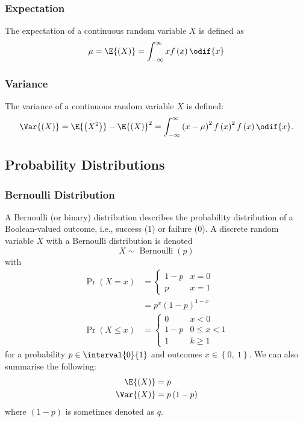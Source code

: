 \documentclass{article}
\begin{document}
\subsubsection{Expectation}
The expectation of a continuous random variable \(X\) is defined as
\begin{equation*}
    \mu = \E{\left( X \right)} = \int_{-\infty}^\infty x f\left( x \right) \odif{x}
\end{equation*}
\subsubsection{Variance}
The variance of a continuous random variable \(X\) is defined:
\begin{equation*}
    \Var{\left( X \right)} = \E{\left( X^2 \right)} - \E{\left( X \right)}^2 = \int_{-\infty}^\infty \left( x - \mu \right)^2 f\left( x \right)^2 f\left( x \right) \odif{x}.
\end{equation*}
\subsection{Probability Distributions}
\subsubsection{Bernoulli Distribution}
A Bernoulli (or binary) distribution describes the probability
distribution of a Boolean-valued outcome, i.e., success (1) or failure
(0). A discrete random variable \(X\) with a Bernoulli distribution is
denoted
\begin{equation*}
    X \sim \operatorname{Bernoulli}{\left( p \right)}
\end{equation*}
with
\begin{align*}
    \Pr{\left( X = x \right)}    & =
    \begin{cases}
        1 - p & x = 0 \\
        p     & x = 1
    \end{cases}
    \\
                                 & = p^x \left( 1 - p \right)^{1 - x} \\
    \Pr{\left( X \leq x \right)} & =
    \begin{cases}
        0     & x < 0        \\
        1 - p & 0 \leq x < 1 \\
        1     & k \geq 1
    \end{cases}
\end{align*}
for a probability \(p \in \interval{0}{1}\) and outcomes \(x \in \left\{ 0,\: 1 \right\}\).
We can also summarise the following:
\begin{align*}
    \E{\left( X \right)}   & = p                      \\
    \Var{\left( X \right)} & = p \left( 1 - p \right)
\end{align*}
where \(\left( 1 - p \right)\) is sometimes denoted as \(q\).
\end{document}
